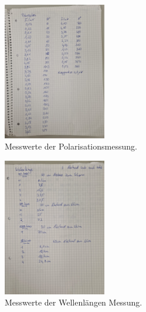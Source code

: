 \begin{figure}
    \centering
    \includegraphics[height=6cm]{content/pics/polarisation.jpg}
    \caption{Messwerte der Polarisationsmessung.}
\end{figure}

\begin{figure}
    \centering
    \includegraphics[height=6cm]{content/pics/wellenlaenge.jpg}
    \caption{Messwerte der Wellenlängen Messung.}
\end{figure}